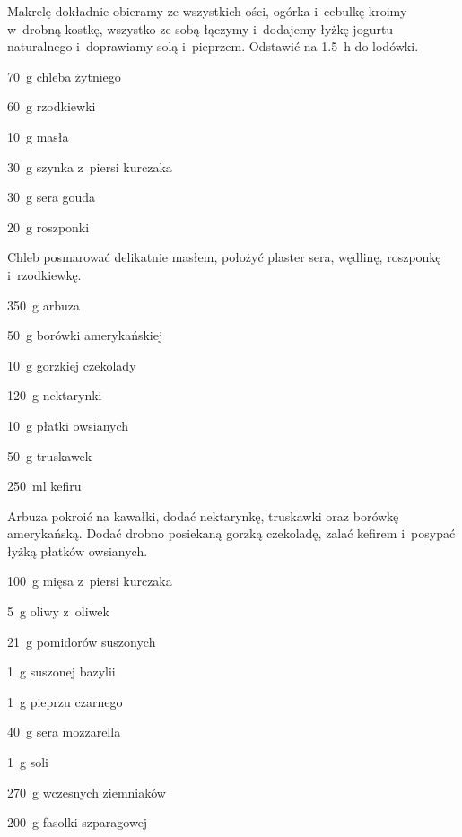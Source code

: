 \documentclass[../main.tex]{subfiles}
\begin{document}
Makrelę dokładnie obieramy ze wszystkich ości, ogórka i~cebulkę kroimy w~drobną
kostkę, wszystko ze sobą łączymy i~dodajemy łyżkę jogurtu naturalnego
i~doprawiamy solą i~pieprzem. Odstawić na \qty{1.5}{\hour} do lodówki.


\begin{Ingred}
    \item \qty{70}{\gram} chleba żytniego
    \item \qty{60}{\gram} rzodkiewki
    \item \qty{10}{\gram} masła
    \item \qty{30}{\gram} szynka z~piersi kurczaka
    \item \qty{30}{\gram} sera gouda
    \item \qty{20}{\gram} roszponki
\end{Ingred}

Chleb posmarować delikatnie masłem, położyć plaster sera, wędlinę, roszponkę
i~rzodkiewkę.


\begin{Ingred}
    \item \qty{350}{\gram} arbuza
    \item \qty{50}{\gram} borówki amerykańskiej
    \item \qty{10}{\gram} gorzkiej czekolady
    \item \qty{120}{\gram} nektarynki
    \item \qty{10}{\gram} płatki owsianych
    \item \qty{50}{\gram} truskawek
    \item \qty{250}{\milli\litre} kefiru
\end{Ingred}

Arbuza pokroić na kawałki, dodać nektarynkę, truskawki oraz borówkę
amerykańską. Dodać drobno posiekaną gorzką czekoladę, zalać kefirem i~posypać
łyżką płatków owsianych.


\begin{Ingred}
    \item \qty{100}{\gram} mięsa z~piersi kurczaka
    \item \qty{5}{\gram} oliwy z~oliwek
    \item \qty{21}{\gram} pomidorów suszonych
    \item \qty{1}{\gram} suszonej bazylii
    \item \qty{1}{\gram} pieprzu czarnego
    \item \qty{40}{\gram} sera mozzarella
    \item \qty{1}{\gram} soli
    \item \qty{270}{\gram} wczesnych ziemniaków
    \item \qty{200}{\gram} fasolki szparagowej
\end{Ingred}
\end{document}
